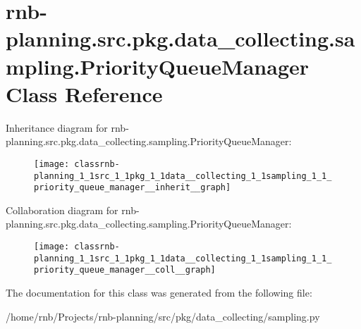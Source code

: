 \hypertarget{classrnb-planning_1_1src_1_1pkg_1_1data__collecting_1_1sampling_1_1_priority_queue_manager}{}\section{rnb-\/planning.src.\+pkg.\+data\+\_\+collecting.\+sampling.\+Priority\+Queue\+Manager Class Reference}
\label{classrnb-planning_1_1src_1_1pkg_1_1data__collecting_1_1sampling_1_1_priority_queue_manager}


Inheritance diagram for rnb-\/planning.src.\+pkg.\+data\+\_\+collecting.\+sampling.\+Priority\+Queue\+Manager\+:\nopagebreak
\begin{figure}[H]
\begin{center}
\leavevmode
\texttt{[image: classrnb-planning\_1\_1src\_1\_1pkg\_1\_1data\_\_collecting\_1\_1sampling\_1\_1\_priority\_queue\_manager\_\_inherit\_\_graph]}
\end{center}
\end{figure}


Collaboration diagram for rnb-\/planning.src.\+pkg.\+data\+\_\+collecting.\+sampling.\+Priority\+Queue\+Manager\+:\nopagebreak
\begin{figure}[H]
\begin{center}
\leavevmode
\texttt{[image: classrnb-planning\_1\_1src\_1\_1pkg\_1\_1data\_\_collecting\_1\_1sampling\_1\_1\_priority\_queue\_manager\_\_coll\_\_graph]}
\end{center}
\end{figure}


The documentation for this class was generated from the following file\+:\begin{DoxyCompactItemize}
\item 
/home/rnb/\+Projects/rnb-\/planning/src/pkg/data\+\_\+collecting/sampling.\+py\end{DoxyCompactItemize}
